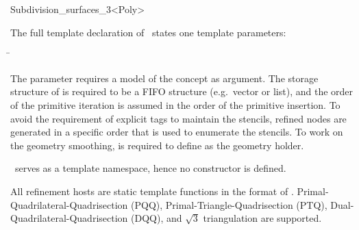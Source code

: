 \begin{ccRefClass}{Subdivision_surfaces_3<Poly>}

\ccParameters

The full template declaration of \ccClassTemplateName\ states one
template parameters:

\begin{tabbing}
 \= 
\end{tabbing}
   
The parameter  requires a model of 
the  concept as argument. The storage structure
of  is required to be a FIFO structure (e.g.~vector 
or list), and the order of the primitive iteration is assumed in the order
of the primitive insertion. To avoid the requirement of explicit tags 
to maintain the stencils, refined nodes are generated in a specific order that
is used to enumerate the stencils. To work on the geometry smoothing, 
 is required to define  as the geometry
holder.








\ccCreation
{}

\ccClassTemplateName\ serves as a template namespace, hence no constructor
is defined. 




All refinement hosts are static template functions in the format of
.
Primal-Quadrilateral-Quadrisection (PQQ), Primal-Triangle-Quadrisection 
(PTQ), Dual-Quadrilateral-Quadrisection (DQQ), and $\sqrt{3}$ triangulation
are supported.


\end{ccRefClass}
